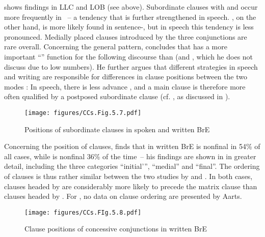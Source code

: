  shows  findings in LLC and LOB (see  above). Subordinate clauses with  and  occur more frequently in ~– a tendency that is further strengthened in speech. , on the other hand, is more likely found in sentence-, but in speech this tendency is less pronounced. Medially placed clauses introduced by the three conjunctions are rare overall. Concerning the general pattern, \citet[22–23]{Altenberg1986} concludes that  has a more important “” function for the following discourse than  (and , which he does not discuss due to low numbers). He further argues that different  strategies in speech and writing are responsible for differences in clause positions between the two modes \citep[20-22]{Altenberg1986}: In speech, there is less advance , and a main clause is therefore more often qualified by a postposed subordinate clause (cf. \citealt{Diessel2005}, as discussed in ).

\begin{figure}
\texttt{[image: figures/CCs.Fig.5.7.pdf]}
\caption{\label{bkm:Ref471494167}\label{fig:5.7}Positions of subordinate clauses in spoken and written BrE \citep[22]{Altenberg1986}}
\end{figure}

Concerning the position of clauses, \citet[43–44]{Aarts1988} finds that in written BrE  is nonfinal in 54\% of all cases, while  is nonfinal 36\% of the time~– his findings are shown in  in greater detail, including the three categories “initial’”, “medial” and “final”. The ordering of clauses is thus rather similar between the two studies by \citet{Altenberg1986} and \citet{Aarts1988}. In both cases, clauses headed by  are considerably more likely to precede the matrix clause than clauses headed by . For , no data on clause ordering are presented by Aarts.

\begin{figure}
\texttt{[image: figures/CCs.FIg.5.8.pdf]}
\caption{\label{bkm:Ref35783219}\label{fig:5.8}Clause positions of concessive conjunctions in written BrE \citep{Aarts1988} }
 \end{figure}

